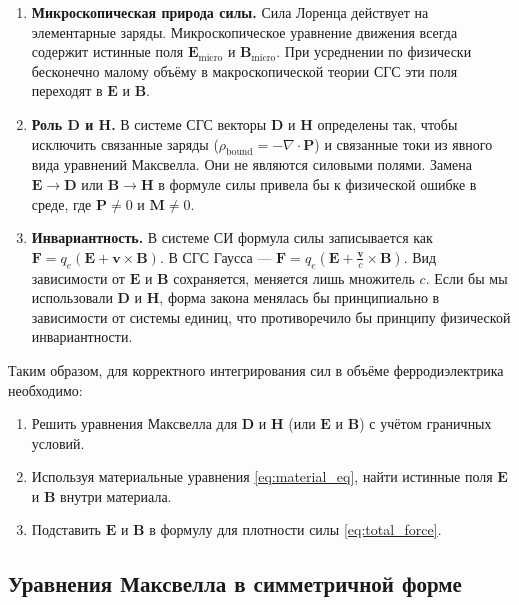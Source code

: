 \documentclass[a4paper,12pt]{article}
\begin{document}
\begin{enumerate}
    \item \textbf{Микроскопическая природа силы.} Сила Лоренца действует на элементарные заряды. Микроскопическое уравнение движения всегда содержит истинные поля $\mathbf{E}_{\text{micro}}$ и $\mathbf{B}_{\text{micro}}$. При усреднении по физически бесконечно малому объёму в макроскопической теории СГС эти поля переходят в $\mathbf{E}$ и $\mathbf{B}$.

    \item \textbf{Роль $\mathbf{D}$ и $\mathbf{H}$.} В системе СГС векторы $\mathbf{D}$ и $\mathbf{H}$ определены так, чтобы исключить связанные заряды ($\rho_{\text{bound}} = -\nabla \cdot \mathbf{P}$) и связанные токи из явного вида уравнений Максвелла. Они не являются силовыми полями. Замена $\mathbf{E} \to \mathbf{D}$ или $\mathbf{B} \to \mathbf{H}$ в формуле силы привела бы к физической ошибке в среде, где $\mathbf{P} \neq 0$ и $\mathbf{M} \neq 0$.

    \item \textbf{Инвариантность.} В системе СИ формула силы записывается как $\mathbf{F} = q_e(\mathbf{E} + \mathbf{v}\times\mathbf{B})$. В СГС Гаусса --- $\mathbf{F} = q_e(\mathbf{E} + \frac{\mathbf{v}}{c}\times\mathbf{B})$. Вид зависимости от $\mathbf{E}$ и $\mathbf{B}$ сохраняется, меняется лишь множитель $c$. Если бы мы использовали $\mathbf{D}$ и $\mathbf{H}$, форма закона менялась бы принципиально в зависимости от системы единиц, что противоречило бы принципу физической инвариантности.
\end{enumerate}

Таким образом, для корректного интегрирования сил в объёме ферродиэлектрика необходимо:
\begin{enumerate}
    \item Решить уравнения Максвелла для $\mathbf{D}$ и $\mathbf{H}$ (или $\mathbf{E}$ и $\mathbf{B}$) с учётом граничных условий.
    \item Используя материальные уравнения \eqref{eq:material_eq}, найти истинные поля $\mathbf{E}$ и $\mathbf{B}$ внутри материала.
    \item Подставить $\mathbf{E}$ и $\mathbf{B}$ в формулу для плотности силы \eqref{eq:total_force}.
\end{enumerate}

\subsection{Уравнения Максвелла в симметричной форме}
\end{document}
